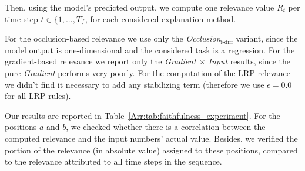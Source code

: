 \documentclass[runningheads]{llncs}
\begin{document}
Then, using the model's predicted output, we compute one relevance value $R_t$ per time step $t \in \{1,...,T\}$, for each considered explanation method.

For the occlusion-based relevance we use only the {\it Occlusion}$_\text{f-diff}$ variant, since the model output is one-dimensional and the considered task is a regression.
For the gradient-based relevance we report only the {\it Gradient $\times$ Input} results, since the pure {\it Gradient} performs very poorly.
For the computation of the LRP relevance we didn't find it necessary to add any stabilizing term (therefore we use $\epsilon=0.0$ for all LRP rules).

Our results are reported in Table~\ref{Arr:tab:faithfulness_experiment}. 
For the positions $a$ and $b$, we checked whether there is a correlation between the computed relevance and the input numbers' actual value. Besides, we verified the portion of the relevance (in absolute value) assigned to these  positions, compared to the relevance attributed to all time steps in the sequence.
\end{document}
